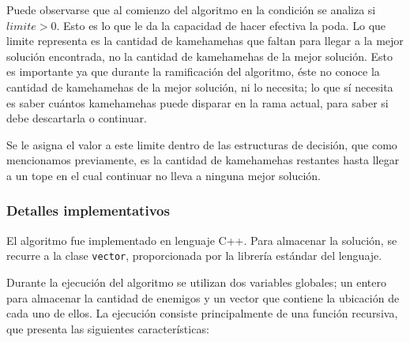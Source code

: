 \begin{enumerate}
        Puede observarse que al comienzo del algoritmo en la condición se analiza si $limite > 0$. Esto es lo que le da la capacidad de hacer efectiva la poda. 
        Lo que limite representa es la cantidad de kamehamehas que faltan para llegar a la mejor solución encontrada, no la cantidad de kamehamehas de la mejor solución. Esto es importante ya que durante la ramificación del algoritmo, éste no conoce la cantidad de kamehamehas de la mejor solución, ni lo necesita; lo que sí necesita es saber cuántos kamehamehas puede disparar en la rama actual, para saber si debe descartarla o continuar.

        Se le asigna el valor a este limite dentro de las estructuras de decisión, que como mencionamos previamente, es la cantidad de kamehamehas restantes hasta llegar a un tope en el cual continuar no lleva a ninguna mejor solución.

    \end{enumerate}

    \subsubsection{Detalles implementativos}
    
    El algoritmo fue implementado en lenguaje C++. Para almacenar la solución, se recurre a la clase \texttt{vector}, proporcionada por la librería estándar del lenguaje.

    Durante la ejecución del algoritmo se utilizan dos variables globales; un entero para almacenar la cantidad de enemigos y un vector que contiene la ubicación de cada uno de ellos. La ejecución consiste principalmente de una función recursiva, que presenta las siguientes características:

